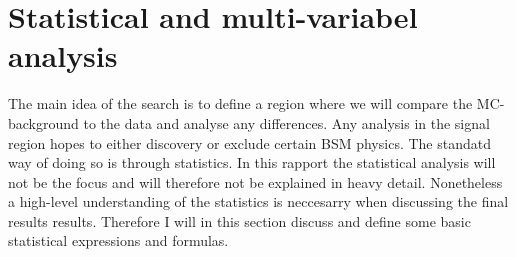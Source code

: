 \chapter{Statistical and multi-variabel analysis}
The main idea of the search is to define a region where we will compare
the MC-background to the data and analyse any differences. Any analysis
in the signal region hopes to either discovery or exclude certain BSM
physics. The standatd way of doing so is through statistics. In this rapport
the statistical analysis will not be the focus and will therefore not be
explained in heavy detail. Nonetheless a high-level understanding of the 
statistics is neccesarry when discussing the final results results. Therefore 
I will in this section discuss and define some basic statistical 
expressions and formulas.
